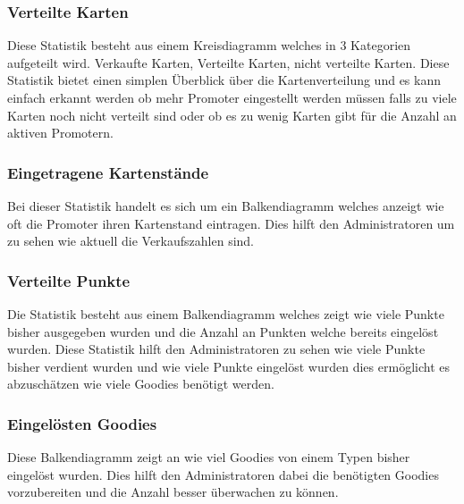 			\subsubsection{Verteilte Karten}
				Diese Statistik besteht aus einem Kreisdiagramm welches in 3 Kategorien aufgeteilt wird. Verkaufte Karten, Verteilte Karten, nicht verteilte Karten. Diese Statistik bietet einen simplen Überblick über die Kartenverteilung und es kann einfach erkannt werden ob mehr Promoter eingestellt werden müssen falls zu viele Karten noch nicht verteilt sind oder ob es zu wenig Karten gibt für die Anzahl an aktiven Promotern. 
				
			\subsubsection{Eingetragene Kartenstände}
				Bei dieser Statistik handelt es sich um ein Balkendiagramm welches anzeigt wie oft die Promoter ihren Kartenstand eintragen. Dies hilft den Administratoren um zu sehen wie aktuell die Verkaufszahlen sind.
				
			\subsubsection{Verteilte Punkte}
				Die Statistik besteht aus einem Balkendiagramm welches zeigt wie viele Punkte bisher ausgegeben wurden und die Anzahl an Punkten welche bereits eingelöst wurden. Diese Statistik hilft den Administratoren zu sehen wie viele Punkte bisher verdient wurden und wie viele Punkte eingelöst wurden dies ermöglicht es abzuschätzen wie viele Goodies benötigt werden. 
				
			\subsubsection{Eingelösten Goodies}
				Diese Balkendiagramm zeigt an wie viel Goodies von einem Typen bisher eingelöst wurden. Dies hilft den Administratoren dabei die benötigten Goodies vorzubereiten und die Anzahl besser überwachen zu können. 
